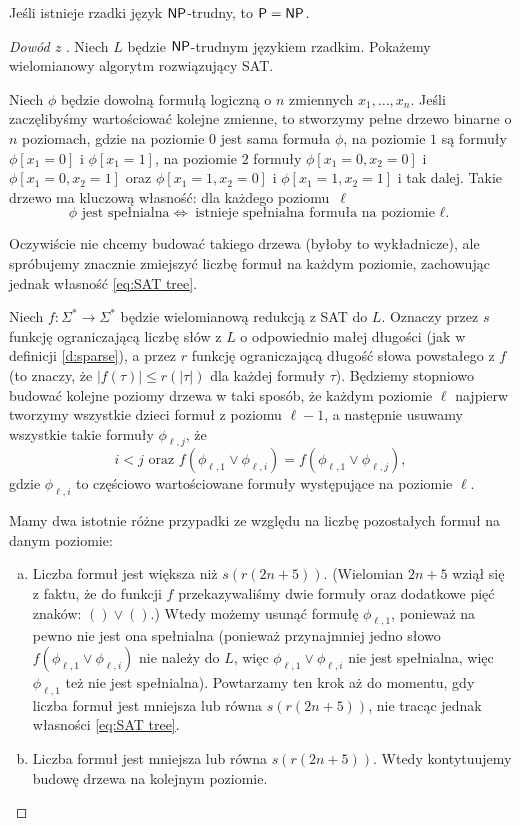 \begin{theorem}[Mahaneya]
    Jeśli istnieje rzadki język $\textsf{NP}$-trudny, to $\textsf{P} = \textsf{NP}$.
\end{theorem}
\begin{proof}[Dowód z \cite{Grochow16}]
    Niech $L$ będzie $\textsf{NP}$-trudnym językiem rzadkim. Pokażemy wielomianowy algorytm rozwiązujący SAT.

    Niech $\phi$ będzie dowolną formułą logiczną o $n$ zmiennych $x_1, \ldots, x_n$. Jeśli zaczęlibyśmy wartościować kolejne zmienne, to stworzymy pełne drzewo binarne o $n$ poziomach, gdzie na poziomie $0$ jest sama formuła $\phi$, na poziomie $1$ są formuły $\phi[x_1 = 0]$ i $\phi[x_1 = 1]$, na poziomie $2$ formuły $\phi[x_1 = 0, x_2 = 0]$ i $\phi[x_1 = 0, x_2 = 1]$ oraz $\phi[x_1 = 1, x_2 = 0]$ i $\phi[x_1 = 1, x_2 = 1]$ i tak dalej. Takie drzewo ma kluczową własność: dla każdego poziomu~$\ell$
    \begin{equation}\label{eq:SAT tree}
        \phi \text{ jest spełnialna} \iff \text{istnieje spełnialna formuła na poziomie $\ell$.}
    \end{equation}

    Oczywiście nie chcemy budować takiego drzewa (byłoby to wykładnicze), ale spróbujemy znacznie zmiejszyć liczbę formuł na każdym poziomie, zachowując jednak własność \ref{eq:SAT tree}.

    Niech $f : \Sigma^* \to \Sigma^*$ będzie wielomianową redukcją z SAT do $L$. Oznaczy przez $s$ funkcję ograniczającą liczbę słów z $L$ o odpowiednio małej długości (jak w definicji \ref{d:sparse}), a przez $r$ funkcję ograniczającą długość słowa powstałego z $f$ (to znaczy, że $|f(\tau)| \leq r(|\tau|)$ dla każdej formuły $\tau$).
    Będziemy stopniowo budować kolejne poziomy drzewa w taki sposób, że każdym poziomie $\ell$ najpierw tworzymy wszystkie dzieci formuł z poziomu $\ell - 1$, a następnie usuwamy wszystkie takie formuły $\phi_{\ell, j}$, że
    \[ i < j \text{ oraz } f(\phi_{\ell, 1} \lor \phi_{\ell, i}) = f(\phi_{\ell, 1} \lor \phi_{\ell, j}), \]
    gdzie $\phi_{\ell, i}$ to częściowo wartościowane formuły występujące na poziomie $\ell$.

    Mamy dwa istotnie różne przypadki ze względu na liczbę pozostałych formuł na danym poziomie:
    \begin{enumerate}[(a)]
        \item Liczba formuł jest większa niż $s(r(2n + 5))$. (Wielomian $2n + 5$ wziął się z faktu, że do funkcji $f$ przekazywaliśmy dwie formuły oraz dodatkowe pięć znaków: $() \lor ()$.)
        Wtedy możemy usunąć formułę $\phi_{\ell, 1}$, ponieważ na pewno nie jest ona spełnialna (ponieważ przynajmniej jedno słowo $f(\phi_{\ell, 1} \lor \phi_{\ell, i})$ nie należy do $L$, więc $\phi_{\ell, 1} \lor \phi_{\ell, i}$ nie jest spełnialna, więc $\phi_{\ell, 1}$ też nie jest spełnialna).
        Powtarzamy ten krok aż do momentu, gdy liczba formuł jest mniejsza lub równa $s(r(2n + 5))$, nie tracąc jednak własności \ref{eq:SAT tree}. 
        \item Liczba formuł jest mniejsza lub równa $s(r(2n + 5))$. Wtedy kontytuujemy budowę drzewa na kolejnym poziomie.
    \end{enumerate}


\end{proof}
